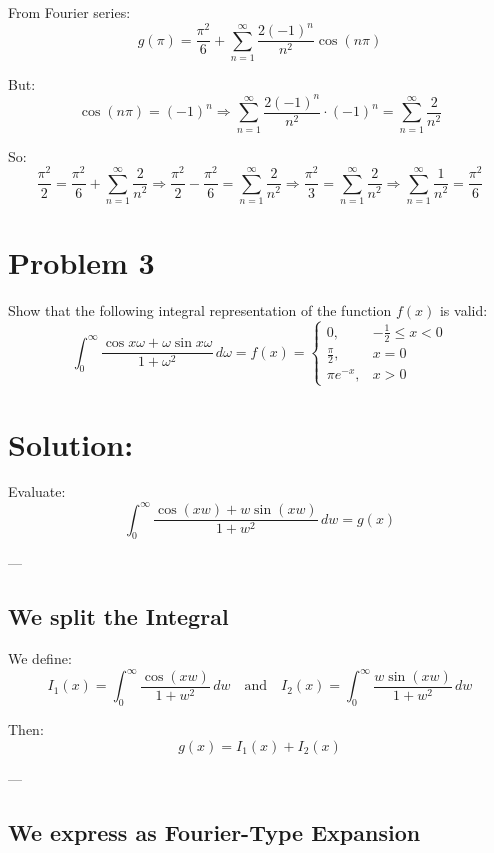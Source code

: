 \documentclass{article}
\begin{document}
From Fourier series:
\[
g(\pi) = \frac{\pi^2}{6} + \sum_{n=1}^{\infty} \frac{2(-1)^n}{n^2} \cos(n\pi)
\]

But:
\[
\cos(n\pi) = (-1)^n \Rightarrow \sum_{n=1}^{\infty} \frac{2(-1)^n}{n^2} \cdot (-1)^n = \sum_{n=1}^{\infty} \frac{2}{n^2}
\]

So:
\[
\frac{\pi^2}{2} = \frac{\pi^2}{6} + \sum_{n=1}^{\infty} \frac{2}{n^2}
\Rightarrow \frac{\pi^2}{2} - \frac{\pi^2}{6} = \sum_{n=1}^{\infty} \frac{2}{n^2}
\Rightarrow \frac{\pi^2}{3} = \sum_{n=1}^{\infty} \frac{2}{n^2}
\Rightarrow \sum_{n=1}^{\infty} \frac{1}{n^2} = \boxed{ \frac{\pi^2}{6} }
\]


\newpage
\section*{Problem 3}

\noindent
Show that the following integral representation of the function \( f(x) \) is valid:
\[
\int_0^{\infty} \frac{\cos x\omega + \omega \sin x\omega}{1 + \omega^2} \, d\omega = f(x) =
\begin{cases}
0, & -\frac{1}{2} \le x < 0 \\[6pt]
\frac{\pi}{2}, & x = 0 \\[6pt]
\pi e^{-x}, & x > 0
\end{cases}
\]

\section*{Solution:}

Evaluate:
\[
\int_0^\infty \frac{\cos(xw) + w \sin(xw)}{1 + w^2} \, dw = g(x)
\]

---

\subsection*{We split the Integral}

We define:
\[
I_1(x) = \int_0^\infty \frac{\cos(xw)}{1 + w^2} \, dw
\quad\text{and}\quad
I_2(x) = \int_0^\infty \frac{w \sin(xw)}{1 + w^2} \, dw
\]

Then:
\[
g(x) = I_1(x) + I_2(x)
\]

---

\subsection*{We express as Fourier-Type Expansion}
\end{document}

